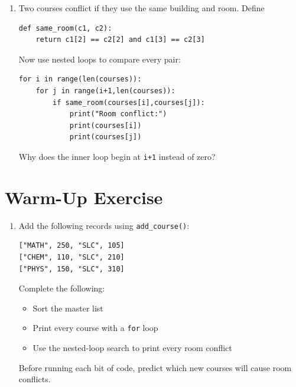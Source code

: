 \documentclass{article}
\begin{document}
\begin{enumerate}

\item Two courses conflict if they use the same building and room. Define

\begin{verbatim}
def same_room(c1, c2):
    return c1[2] == c2[2] and c1[3] == c2[3]
\end{verbatim}

Now use nested loops to compare every pair:

\begin{verbatim}
for i in range(len(courses)):
    for j in range(i+1,len(courses)):
        if same_room(courses[i],courses[j]):
            print("Room conflict:")
            print(courses[i])
            print(courses[j])
\end{verbatim}

Why does the inner loop begin at \texttt{i+1} instead of zero?

\end{enumerate}

\section{Warm-Up Exercise}

\begin{enumerate}

\item Add the following records using
\texttt{add\_course()}:

\begin{verbatim}
["MATH", 250, "SLC", 105]
["CHEM", 110, "SLC", 210]
["PHYS", 150, "SLC", 310]
\end{verbatim}

Complete the following:

\begin{itemize}
\item Sort the master list
\item Print every course with a \texttt{for} loop
\item Use the nested-loop search to print every room conflict
\end{itemize}

Before running each bit of code, predict which new courses will cause room conflicts.

\end{enumerate}
\end{document}
